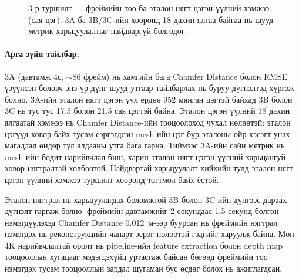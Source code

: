 \begin{figure}[H]
\centering
{}
\caption{3-р туршилт --- фреймийн тоо ба эталон нягт цэгэн үүлний хэмжээ (сая цэг). 3A ба 3B/3C-ийн хооронд 18 дахин ялгаа байгаа нь шууд метрик харьцуулалтыг найдваргүй болгодог.}
\label{fig:exp3_refpts}
\end{figure}

\FloatBarrier

\paragraph{Арга зүйн тайлбар.}
3A (давтамж 4с, ${\sim}86$ фрейм) нь хамгийн бага Chamfer Distance болон RMSE үзүүлсэн боловч энэ үр дүнг шууд утгаар тайлбарлах нь буруу дүгнэлтэд хүргэж болно. 3A-ийн эталон нягт цэгэн үүл ердөө 952 мянган цэгтэй байхад 3B болон 3C нь тус тус 17.5 болон 21.5 сая цэгтэй байна. Эталон цэгэн үүлний 18 дахин ялгаатай хэмжээ нь Chamfer Distance-ийн тооцоолоход чухал нөлөөтэй: эталон цэгүүд ховор байх тусам сэргэгдсэн mesh-ийн цэг бүр эталоны ойр хэсэгт унах магадлал өндөр тул алдааны утга бага гарна. Тиймээс 3A-ийн сайн метрик нь mesh-ийн бодит нарийвчлал биш, харин эталон нягт цэгэн үүлний харьцангуй ховор нягтралтай холбоотой. Найдвартай харьцуулалт хийхийн тулд эталон нягт цэгэн үүлний хэмжээ туршилт хооронд тогтмол байх ёстой.

Эталон нягтрал нь харьцуулагдах боломжтой 3B болон 3C-ийн дүнгээс дараах дүгнэлт гаргаж болно: фреймийн давтамжийг 2 секундаас 1.5 секунд болгон нэмэгдүүлэхэд Chamfer Distance 0.012~м-ээр буурсан нь фреймийн нягтрал нэмэгдэх нь реконструкцийн чанарт эерэг нөлөөтэй гэдгийг харуулж байна. Мөн 4K нарийвчлалтай оролт нь pipeline-ийн feature extraction болон depth map тооцооллын хугацааг мэдэгдэхүйц уртасгаж байсан бөгөөд фреймийн тоо нэмэгдэх тусам тооцооллын зардал шугаман бус өсдөг болох нь ажиглагдсан.